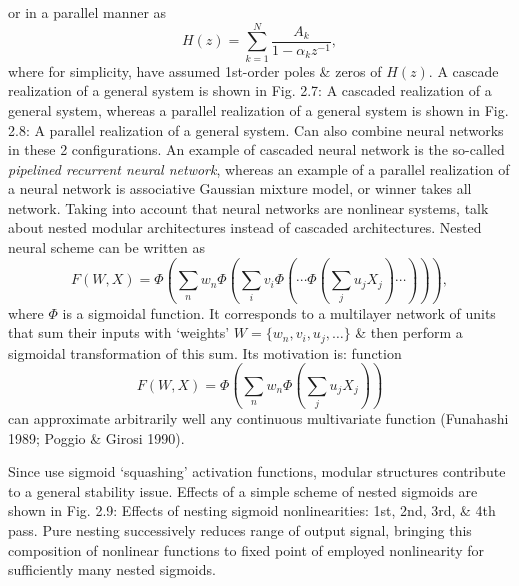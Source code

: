 \documentclass{article}
\begin{document}
\begin{enumerate}
\begin{itemize}
\begin{itemize}
			or in a parallel manner as
			\begin{equation}
				H(z) = \sum_{k=1}^N \frac{A_k}{1 - \alpha_kz^{-1}},
			\end{equation}
			where for simplicity, have assumed 1st-order poles \& zeros of $H(z)$. A cascade realization of a general system is shown in {\sf Fig. 2.7: A cascaded realization of a general system}, whereas a parallel realization of a general system is shown in {\sf Fig. 2.8: A parallel realization of a general system}. Can also combine neural networks in these 2 configurations. An example of cascaded neural network is the so-called {\it pipelined recurrent neural network}, whereas an example of a parallel realization of a neural network is associative Gaussian mixture model, or winner takes all network. Taking into account that neural networks are nonlinear systems, talk about nested modular architectures instead of cascaded architectures. Nested neural scheme can be written as
			\begin{equation}
				F(W,X) = \Phi\left(\sum_n w_n\Phi\left(\sum_i v_i\Phi\left(\cdots\Phi\left(\sum_j u_jX_j\right)\cdots\right)\right)\right),
			\end{equation}
			where $\Phi$ is a sigmoidal function. It corresponds to a multilayer network of units that sum their inputs with `weights' $W = \{w_n,v_i,u_j,\ldots\}$ \& then perform a sigmoidal transformation of this sum. Its motivation is: function
			\begin{equation}
				F(W,X) = \Phi\left(\sum_n w_n\Phi\left(\sum_j u_jX_j\right)\right)
			\end{equation}
			can approximate arbitrarily well any continuous multivariate function (Funahashi 1989; Poggio \& Girosi 1990).
			
			Since use sigmoid `squashing' activation functions, modular structures contribute to a general stability issue. Effects of a simple scheme of nested sigmoids are shown in {\sf Fig. 2.9: Effects of nesting sigmoid nonlinearities: 1st, 2nd, 3rd, \& 4th pass.} Pure nesting successively reduces range of output signal, bringing this composition of nonlinear functions to fixed point of employed nonlinearity for sufficiently many nested sigmoids.
			

\end{itemize}
\end{itemize}
\end{enumerate}
\end{document}
